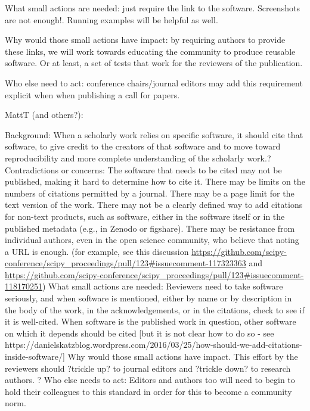 \documentclass[a4paper,UKenglish]{dagman}
\begin{document}
What small actions are needed: just require the link to the software. Screenshots are not enough!. Running examples will be helpful as well.

Why would those small actions have impact: by requiring authors to provide these links, we will work towards educating the community to produce reusable software. Or at least, a set of tests that work for the reviewers of the publication. 

Who else need to act: conference chairs/journal editors may add this requirement explicit when when publishing a call for papers. 

MattT (and others?):


   Background: When a scholarly work relies on specific software, it should cite that software, to give credit to the creators of that software and to move toward reproducibility and more complete understanding of the scholarly work.?   Contradictions or concerns: The software that needs to be cited may not be published, making it hard to determine how to cite it.  There may be limits on the numbers of citations permitted by a journal.  There may be a page limit for the text version of the work.  There may not be a clearly defined way to add citations for non-text products, such as software, either in the software itself or in the published metadata (e.g., in Zenodo or figshare). There may be resistance from individual authors, even in the open science community, who believe that noting a URL is enough. (for example, see this discussion 
\url{https://github.com/scipy-conference/scipy_proceedings/pull/123#issuecomment-117323363} and 
\url{https://github.com/scipy-conference/scipy_proceedings/pull/123#issuecomment-118170251}) 
   What small actions are needed: Reviewers need to take software seriously, and when software is mentioned, either by name or by description in the body of the work, in the acknowledgements, or in the citations, check to see if it is well-cited.  When software is the published work in question, other software on which it depends should be cited [but it is not clear how to do so - see https://danielskatzblog.wordpress.com/2016/03/25/how-should-we-add-citations-inside-software/]
   Why would those small actions have impact. This effort by the reviewers should ?trickle up? to journal editors and ?trickle down? to research authors. ?   Who else needs to act: Editors and authors too will need to begin to hold their colleagues to this standard in order for this to become a community norm.
\end{document}

